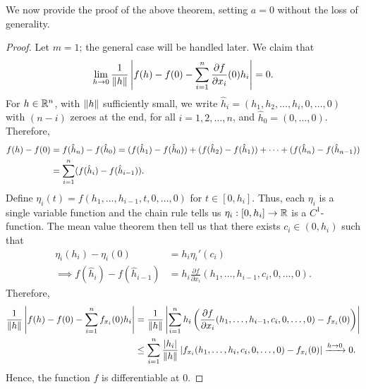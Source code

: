 We now provide the proof of the above theorem, setting $a = 0$ without the loss of generality.
\begin{proof}
    Let $m = 1$; the general case will be handled later. We claim that
    \begin{align}
        \lim_{h \to 0} \frac{1}{\left\lVert h\right\rVert} \left| f(h)-f(0) - \sum_{i=1}^{n} \frac{\partial f}{\partial x_{i}}(0)h_{i} \right| = 0.
    \end{align}
    For $h \in \mathbb{R}^{n}$, with $\left\lVert h\right\rVert$ sufficiently small, we write $\hat{h}_{i} = (h_{1},h_{2},\ldots,h_{i},0,\ldots,0)$ with $(n-i)$ zeroes at the end, for all $i = 1,2,\ldots,n$, and $\hat{h}_{0} = (0,\ldots,0)$. Therefore,
    \begin{align}
        f(h)-f(0) &= f(\hat{h}_{n}) - f(\hat{h}_{0}) = (f(\hat{h}_{1})-f(\hat{h}_{0})) + (f(\hat{h}_{2})-f(\hat{h}_{1})) + \cdots + (f(\hat{h}_{n})-f(\hat{h}_{n-1})) \notag \\ &= \sum_{i=1}^{n} (f(\hat{h}_{i})-f(\hat{h}_{i-1})).
    \end{align}
    Define $\eta_{i}(t) = f(h_{1},\ldots,h_{i-1},t,0,\ldots,0)$ for $t \in [0,h_{i}]$. Thus, each $\eta_{i}$ is a single variable function and the chain rule tells us $\eta_{i}:[0,h_{i}] \to \mathbb{R}$ is a $C^{1}$-function. The mean value theorem then tell us that there exists $c_{i} \in (0,h_{i})$ such that
    \begin{align}
        \eta_{i}(h_{i})-\eta_{i}(0) &= h_{i} \eta_{i}'(c_{i}) \\
        \implies f(\hat{h}_{i})-f(\hat{h}_{i-1}) &= h_{i} \frac{\partial f}{\partial x_{i}}(h_{1},\ldots,h_{i-1},c_{i},0,\ldots,0).
    \end{align}
    Therefore,
    \begin{align}
        \frac{1}{\left\lVert h\right\rVert} \left| f(h)-f(0)-\sum_{i=1}^{n} f_{x_{i}}(0)h_{i} \right| &= \frac{1}{\left\lVert h\right\rVert} \left| \sum_{i=1}^{n} h_{i} \left( \frac{\partial f}{\partial x_{i}}(h_{1},\ldots,h_{i-1},c_{i},0,\ldots,0) - f_{x_{i}}(0) \right) \right| \notag \\
        &\leq \sum_{i=1}^{n} \frac{\left| h_{i} \right|}{\left\lVert h\right\rVert} \left| f_{x_{i}}(h_{1},\ldots,h_{i},c_{i},0,\ldots,0) - f_{x_{i}}(0) \right| \xrightarrow{h \to 0} 0.
    \end{align}
    Hence, the function $f$ is differentiable at $0$.
\end{proof}

